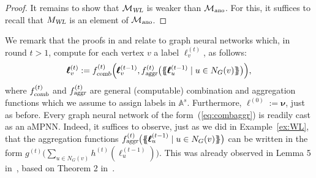 \begin{proof}
%
%

It remains to show that $\mathcal{M}_{\textsl{WL}}$ is weaker than $\mathcal{M}_{\textsl{ano}}$. For this, it suffices to recall that $M_{\textsl{WL}}$ is an element of $\mathcal{M}_{\textsl{ano}}$.
\end{proof}

We remark that the proofs in \cite{xhlj19} and \cite{grohewl} relate to  graph neural networks which, in round $t>1$, compute for each vertex $v$ a label $\pmb{\ell}^{(t)}_{v}$, as follows:
\begin{equation}
\pmb{\ell}^{(t)}_{v}:=
f_{\textsl{comb}}^{(t)}\Bigl(
\pmb{\ell}_{v}^{(t-1)},f_{\textsl{aggr}}^{(t)}\bigl(\{\!\!\{ \pmb{\ell}^{(t-1)}_{u} \mid u \in N_G(v) \}\!\!\}\bigr)
\Bigr), \label{eq:combaggr}
\end{equation}
where $f_{\textsl{comb}}^{(t)}$ and  $f_{\textsl{aggr}}^{(t)}$ are general (computable) combination and aggregation functions which we assume to assign labels in $\mathbb{A}^s$. Furthermore, $\pmb{\ell}^{(0)}:=\pmb{\nu}$, just as before. Every graph neural network of the form~(\ref{eq:combaggr}) is readily cast as an aMPNN. Indeed,
it suffices to observe, just as we did in Example~\ref{ex:WL}, that the aggregation functions $f_{\textsl{aggr}}^{(t)}\bigl(\{\!\!\{ \pmb{\ell}^{(t-1)}_{u} \mid u \in N_G(v) \}\!\!\}\bigr)$ can be written in the form $g^{(t)}\bigl(\sum_{u\in N_G(v)} h^{(t)}(\pmb{\ell}^{(t-1)}_{u})\bigr)$. This was already observed in Lemma 5 in~\cite{xhlj19}, based on Theorem 2 in~\cite{ZaheerKRPSS17}.


